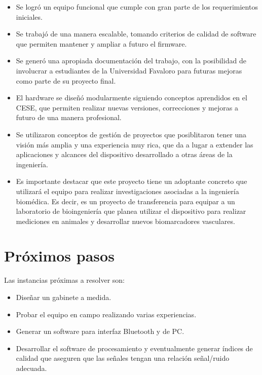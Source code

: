\begin{itemize}

\item Se logró un equipo funcional que cumple con gran parte de los requerimientos iniciales.

\item Se trabajó de una manera escalable, tomando criterios de calidad de software que permiten mantener y ampliar a futuro el firmware.

\item Se generó una apropiada documentación del trabajo, con la posibilidad de involucrar a estudiantes de la Universidad Favaloro para futuras mejoras como parte de su proyecto final.

\item El hardware se diseñó modularmente siguiendo conceptos aprendidos en el CESE, que permiten realizar nuevas versiones, correcciones y mejoras a futuro de una manera profesional.

\item Se utilizaron conceptos de gestión de proyectos que posiblitaron tener una visión más amplia y una experiencia muy rica, que da a lugar a extender las aplicaciones y alcances del dispositivo desarrollado a otras áreas de la ingeniería.

\item Es importante destacar que este proyecto tiene un adoptante concreto que utilizará el equipo para realizar investigaciones asociadas a la ingeniería biomédica. Es decir, es un proyecto de transferencia para equipar a un laboratorio de bioingeniería que planea utilizar el dispositivo para realizar mediciones en animales y desarrollar nuevos biomarcadores vasculares.

\end{itemize}

\section{Próximos pasos}

Las instancias próximas a resolver son:

\begin{itemize}

\item Diseñar un gabinete a medida.

\item Probar el equipo en campo realizando varias experiencias.

\item Generar un software para interfaz Bluetooth y de PC.

\item Desarrollar el software de procesamiento y eventualmente generar índices de calidad que aseguren que las señales tengan una relación señal/ruido adecuada.

\end{itemize}



